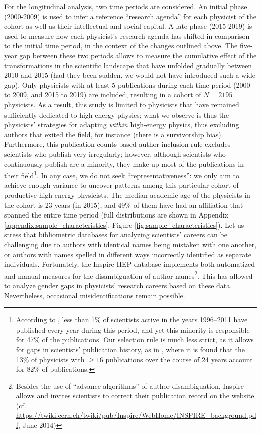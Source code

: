 \documentclass{article}
\begin{document}
For the longitudinal analysis, two time periods are considered. An initial phase (2000-2009) is used to infer a reference ``research agenda'' for each physicist of the cohort as well as their intellectual and social capital. A late phase (2015-2019) is used to measure how each physicist's research agenda has shifted in comparison to the initial time period, in the context of the changes outlined above. The five-year gap between these two periods allows to measure the cumulative effect of the transformations in the scientific landscape that have unfolded gradually between 2010 and 2015 (had they been sudden, we would not have introduced such a wide gap). Only physicists with at least 5 publications during each time period (2000 to 2009, and 2015 to 2019) are included, resulting in a cohort of $N=2195$ physicists. As a result, this study is limited to physicists that have remained sufficiently dedicated to high-energy physics; what we observe is thus the physicists' strategies for adapting \textit{within} high-energy physics, thus excluding authors that exited the field, for instance (there is a survivorship bias). Furthermore, this publication counts-based author inclusion rule excludes scientists who publish very irregularly; however, although scientists who continuously publish are a minority, they make up most of the publications in their field\footnote{According to  \citet{Ioannidis2014}, less than 1\% of scientists active in the years 1996–2011 have published every year during this period, and yet this minority is responsible for 47\% of the publications. Our selection rule is much less strict, as it allows for gaps in scientists' publication history, as in \citealt{Feifan2023}, where it is found that the 13\% of physicists with $\geq 16$ publications over the course of 24 years account for 82\% of publications.}. In any case, we do not seek ``representativeness'': we only aim to achieve enough variance to uncover patterns among this particular cohort of productive high-energy physicists. The median academic age of the physicists in the cohort is 23 years (in 2015), and 49\% of them have had an affiliation that spanned the entire time period (full distributions are shown in Appendix \ref{appendix:sample_characteristics}, Figure \ref{fig:sample_characteristics}). Let us stress that bibliometric databases for analyzing scientists' careers can be challenging due to authors with identical names being mistaken with one another, or authors with names spelled in different ways incorrectly identified as separate individuals. Fortunately, the Inspire HEP database implements both automatized and manual measures for the disambiguation of author names\footnote{Besides the use of ``advance algorithms'' of author-disambiguation, Inspire allows and invites scientists to correct their publication record on the website (cf. \url{https://twiki.cern.ch/twiki/pub/Inspire/WebHome/INSPIRE_background.pdf}, June 2014)}. %
This has allowed \citet{Strumia2021} to analyze gender gaps in physicists' research careers based on these data. Nevertheless, occasional misidentifications remain possible.
\end{document}

